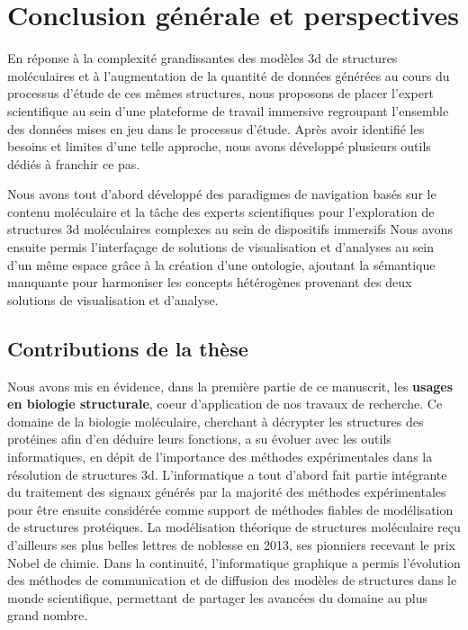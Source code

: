 


\chapter*{Conclusion générale et perspectives}
\mtcaddchapter

\mtcaddpart


En réponse à la complexité grandissantes des modèles 3d de structures moléculaires et à l'augmentation de la quantité de données générées au cours du processus d'étude de ces mêmes structures, nous proposons de placer l'expert scientifique au sein d'une plateforme de travail immersive regroupant l'ensemble des données mises en jeu dans le processus d'étude. Après avoir identifié les besoins et limites d'une telle approche, nous avons développé plusieurs outils dédiés à franchir ce pas. 

Nous avons tout d'abord développé des paradigmes de navigation basés sur le contenu moléculaire et la tâche des experts scientifiques pour l'exploration de structures 3d moléculaires complexes au sein de dispositifs immersifs
Nous avons ensuite permis l'interfaçage de solutions de visualisation et d'analyses au sein d'un même espace grâce à la création d'une ontologie, ajoutant la sémantique manquante pour harmoniser les concepts hétérogènes provenant des deux solutions de visualisation et d'analyse.


\section*{Contributions de la thèse}

Nous avons mis en évidence, dans la première partie de ce manuscrit, les \textbf{usages en biologie structurale}, coeur d'application de nos travaux de recherche. Ce domaine de la biologie moléculaire, cherchant à décrypter les structures des protéines afin d'en déduire leurs fonctions, a su évoluer avec les outils informatiques, en dépit de l'importance des méthodes expérimentales dans la résolution de structures 3d. 
L'informatique a tout d'abord fait partie intégrante du traitement des signaux générés par la majorité des méthodes expérimentales pour être ensuite considérée comme support de méthodes fiables de modélisation de structures protéiques. La modélisation théorique de structures moléculaire reçu d'ailleurs ses plus belles lettres de noblesse en 2013, ses pionniers recevant le prix Nobel de chimie. Dans la continuité, l'informatique graphique a permis l'évolution des méthodes de communication et de diffusion des modèles de structures dans le monde scientifique, permettant de partager les avancées du domaine au plus grand nombre.

